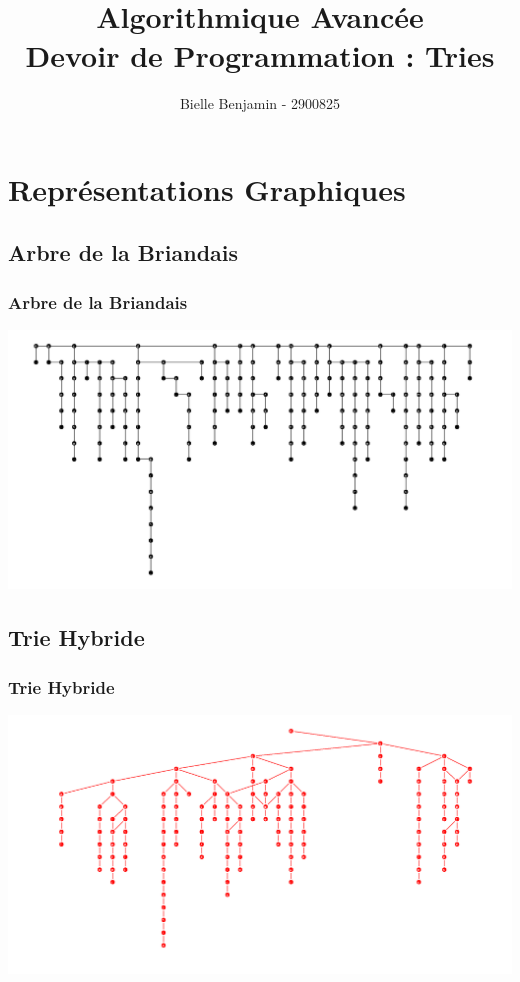 \documentclass{beamer}
\title{Algorithmique Avanc\'ee \\ Devoir de Programmation : Tries}
\author{Bielle Benjamin - 2900825}
\begin{document}
\begin{frame}
  \titlepage
\end{frame}

\section{Repr\'esentations Graphiques}

\subsection{Arbre de la Briandais}
\begin{frame}
  \frametitle{Arbre de la Briandais}
  \begin{center}
    \includegraphics[width=1.1\textwidth]{briandais.png}
  \end{center}
\end{frame}

\subsection{Trie Hybride}
\begin{frame}
  \frametitle{Trie Hybride}
  \begin{center}
    \includegraphics[width=1.1\textwidth]{hybrid.png}
  \end{center}
\end{frame}
\end{document}
